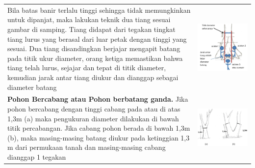 \documentclass[
]{book}
\begin{document}
\begin{longtable}[]{@{}
  >{\raggedright\arraybackslash}p{}
  >{\raggedright\arraybackslash}p{}@{}}
Bila batas banir terlalu tinggi sehingga tidak memungkinkan untuk dipanjat, maka lakukan teknik dua tiang sesuai gambar di samping. Tiang didapat dari tegakan tingkat tiang lurus yang berasal dari luar petak dengan tinggi yang sesuai. Dua tiang disandingkan berjajar mengapit batang pada titik ukur diameter, orang ketiga memastikan bahwa tiang telah lurus, sejajar dan tepat di titik diameter, kemudian jarak antar tiang diukur dan dianggap sebagai diameter batang & \includegraphics{images/vtb6.jpg} \\
\textbf{Pohon Bercabang atau Pohon berbatang ganda.} Jika pohon bercabang dengan tinggi cabang pada atau di atas 1,3m (a) maka pengukuran diameter dilakukan di bawah titik percabangan. Jika cabang pohon berada di bawah 1,3m (b), maka masing-masing batang diukur pada ketinggian 1,3 m dari permukaan tanah dan masing-masing cabang dianggap 1 tegakan & \includegraphics{images/vtb7.jpg} \\

\end{longtable}
\end{document}
